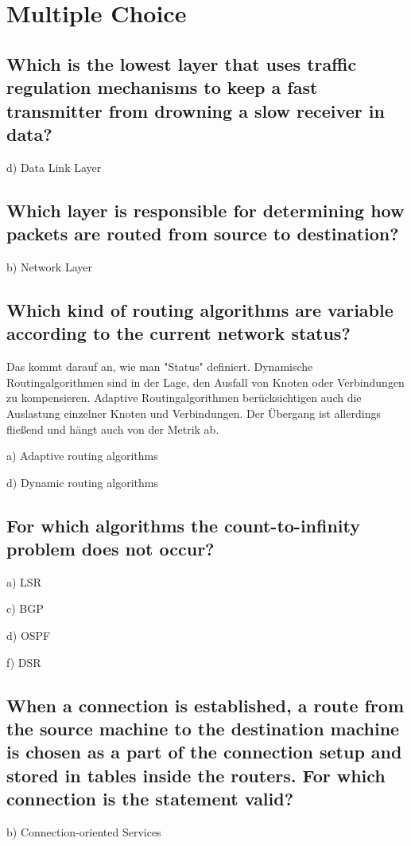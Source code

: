 \documentclass[a4paper,
			llpt,
			solution,
			accentcolor=tud2d,
			colorbacktitle
			]
			{tudexercise}
\newcommand{\8}{$\infty$}
\begin{document}
\section{Multiple Choice}
\subsection{Which is the lowest layer that uses traffic regulation mechanisms to keep a fast transmitter from drowning a slow receiver in data?}
\begin{compactenum}
\item[d)] Data Link Layer
\end{compactenum}
\subsection{Which layer is responsible for determining how packets are routed from source to destination?}
\begin{compactenum}
\item[b)] Network Layer
\end{compactenum}
\subsection{Which kind of routing algorithms are variable according to the current network status?}
Das kommt darauf an, wie man "Status" definiert. Dynamische Routingalgorithmen sind in der Lage, den Ausfall von Knoten oder Verbindungen zu kompensieren. Adaptive Routingalgorithmen berücksichtigen auch die Auslastung einzelner Knoten und Verbindungen. Der Übergang ist allerdings fließend und hängt auch von der Metrik ab.
\begin{compactenum}
\item[a)] Adaptive routing algorithms
\item[d)] Dynamic routing algorithms
\end{compactenum}
\subsection{For which algorithms the count-to-infinity problem does not occur?}
\begin{compactenum}
\item[a)] LSR
\item[c)] BGP
\item[d)] OSPF
\item[f)] DSR
\end{compactenum}
\subsection{When a connection is established, a route from the source machine to the destination machine is chosen as a part of the connection setup and stored in tables inside the routers. For which connection is the statement valid?}
\begin{compactenum}
\item[b)]{Connection-oriented Services}
\end{compactenum}
\end{document}

